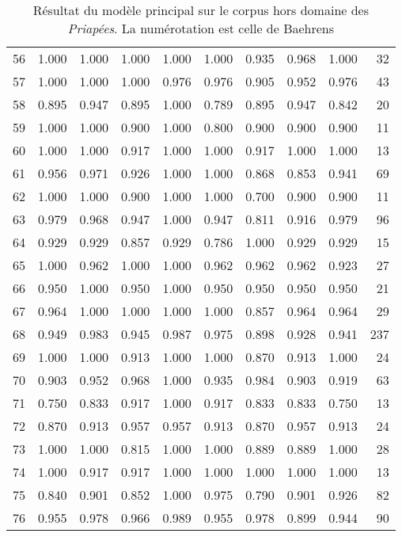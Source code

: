 \begin{table}[]
{\begin{tabular}{lrrrrrrrrr}
    56 &  1.000 & 1.000 & 1.000 &   1.000 &             1.000 & 0.935 & 0.968 & 1.000 &    32 \\
    57 &  1.000 & 1.000 & 1.000 &   0.976 &             0.976 & 0.905 & 0.952 & 0.976 &    43 \\
    58 &  0.895 & 0.947 & 0.895 &   1.000 &             0.789 & 0.895 & 0.947 & 0.842 &    20 \\
    59 &  1.000 & 1.000 & 0.900 &   1.000 &             0.800 & 0.900 & 0.900 & 0.900 &    11 \\
    60 &  1.000 & 1.000 & 0.917 &   1.000 &             1.000 & 0.917 & 1.000 & 1.000 &    13 \\
    61 &  0.956 & 0.971 & 0.926 &   1.000 &             1.000 & 0.868 & 0.853 & 0.941 &    69 \\
    62 &  1.000 & 1.000 & 0.900 &   1.000 &             1.000 & 0.700 & 0.900 & 0.900 &    11 \\
    63 &  0.979 & 0.968 & 0.947 &   1.000 &             0.947 & 0.811 & 0.916 & 0.979 &    96 \\
    64 &  0.929 & 0.929 & 0.857 &   0.929 &             0.786 & 1.000 & 0.929 & 0.929 &    15 \\
    65 &  1.000 & 0.962 & 1.000 &   1.000 &             0.962 & 0.962 & 0.962 & 0.923 &    27 \\
    66 &  0.950 & 1.000 & 0.950 &   1.000 &             0.950 & 0.950 & 0.950 & 0.950 &    21 \\
    67 &  0.964 & 1.000 & 1.000 &   1.000 &             1.000 & 0.857 & 0.964 & 0.964 &    29 \\
    68 &  0.949 & 0.983 & 0.945 &   0.987 &             0.975 & 0.898 & 0.928 & 0.941 &   237 \\
    69 &  1.000 & 1.000 & 0.913 &   1.000 &             1.000 & 0.870 & 0.913 & 1.000 &    24 \\
    70 &  0.903 & 0.952 & 0.968 &   1.000 &             0.935 & 0.984 & 0.903 & 0.919 &    63 \\
    71 &  0.750 & 0.833 & 0.917 &   1.000 &             0.917 & 0.833 & 0.833 & 0.750 &    13 \\
    72 &  0.870 & 0.913 & 0.957 &   0.957 &             0.913 & 0.870 & 0.957 & 0.913 &    24 \\
    73 &  1.000 & 1.000 & 0.815 &   1.000 &             1.000 & 0.889 & 0.889 & 1.000 &    28 \\
    74 &  1.000 & 0.917 & 0.917 &   1.000 &             1.000 & 1.000 & 1.000 & 1.000 &    13 \\
    75 &  0.840 & 0.901 & 0.852 &   1.000 &             0.975 & 0.790 & 0.901 & 0.926 &    82 \\
    76 &  0.955 & 0.978 & 0.966 &   0.989 &             0.955 & 0.978 & 0.899 & 0.944 &    90 \\
    \bottomrule
    \end{tabular}}
    \caption{Résultat du modèle principal sur le corpus hors domaine des \textit{Priapées}. La numérotation est celle de Baehrens}
    \label{tab:priapea_full_results}
\end{table}